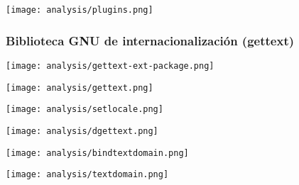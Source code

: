 \begin{center}
\texttt{[image: analysis/plugins.png]} 
\end{center}

\subsubsection{Biblioteca GNU de internacionalización (gettext)}
\begin{center}
\texttt{[image: analysis/gettext-ext-package.png]} 
\end{center}

\begin{center}
\texttt{[image: analysis/gettext.png]} 
\end{center}

\begin{multicols}{2}
\begin{center}
\texttt{[image: analysis/setlocale.png]} 
\end{center}
\begin{center}
\texttt{[image: analysis/dgettext.png]} 
\end{center}
\columnbreak
\begin{center}
\texttt{[image: analysis/bindtextdomain.png]} 
\end{center}
\begin{center}
\texttt{[image: analysis/textdomain.png]} 
\end{center}
\end{multicols}

